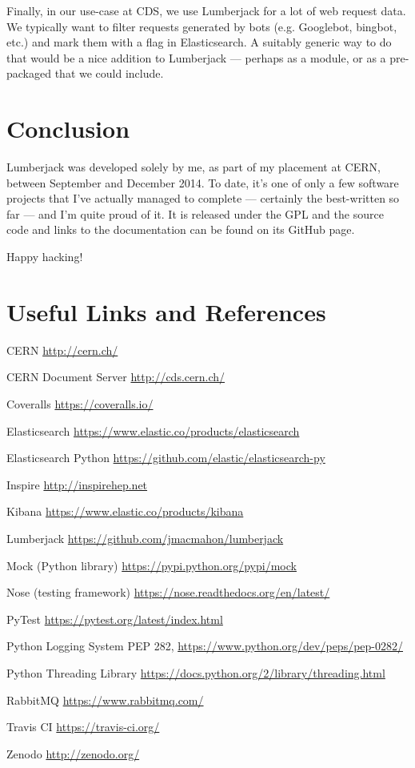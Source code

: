 \documentclass[a4paper,11pt]{article} %
\begin{document}
Finally, in our use-case at CDS, we use Lumberjack for a lot of web request
data.  We typically want to filter requests generated by bots (e.g. Googlebot,
bingbot, etc.) and mark them with a flag in Elasticsearch.  A suitably generic
way to do that would be a nice addition to Lumberjack --- perhaps as a module,
or as a pre-packaged  that we could include.


\section{Conclusion}
\label{sec:conclusion}
Lumberjack was developed solely by me, as part of my placement at CERN, between
September and December 2014.  To date, it's one of only a few software projects
that I've actually managed to complete --- certainly the best-written so far
--- and I'm quite proud of it.  It is released under the GPL and the source
code and links to the documentation can be found on its GitHub page.

Happy hacking!

\section{Useful Links and References}
\label{sec:references}

\begin{description*}
  \item[CERN] \url{http://cern.ch/}
  \item[CERN Document Server] \url{http://cds.cern.ch/}
  \item[Coveralls] \url{https://coveralls.io/}
  \item[Elasticsearch] \url{https://www.elastic.co/products/elasticsearch}
  \item[Elasticsearch Python] \url{https://github.com/elastic/elasticsearch-py}
  \item[Inspire] \url{http://inspirehep.net}
  \item[Kibana] \url{https://www.elastic.co/products/kibana}
  \item[Lumberjack] \url{https://github.com/jmacmahon/lumberjack}
  \item[Mock (Python library)] \url{https://pypi.python.org/pypi/mock}
  \item[Nose (testing framework)] \url{https://nose.readthedocs.org/en/latest/}
  \item[PyTest] \url{https://pytest.org/latest/index.html}
  \item[Python Logging System] PEP 282, \url{https://www.python.org/dev/peps/pep-0282/}
  \item[Python Threading Library] \url{https://docs.python.org/2/library/threading.html}
  \item[RabbitMQ] \url{https://www.rabbitmq.com/}
  \item[Travis CI] \url{https://travis-ci.org/}
  \item[Zenodo] \url{http://zenodo.org/}
\end{description*}
\end{document}
